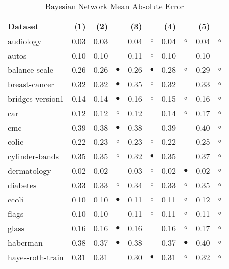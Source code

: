 \newpage
{\centering \footnotesize \begin{longtable}{lrr@{\hspace{0.1cm}}cr@{\hspace{0.1cm}}cr@{\hspace{0.1cm}}cr@{\hspace{0.1cm}}c}
\caption{\label{bnmae}Bayesian Network Mean Absolute Error}
\\
\hline
Dataset & (1)& (2) & & (3) & & (4) & & (5) & \\
\hline
audiology & 0.03 & 0.03 &            & 0.04 &   $\circ$ & 0.04 &   $\circ$ & 0.04 &   $\circ$\\
autos & 0.10 & 0.10 &            & 0.11 &   $\circ$ & 0.10 &           & 0.10 &          \\
balance-scale & 0.26 & 0.26 &  $\bullet$ & 0.26 & $\bullet$ & 0.28 &   $\circ$ & 0.29 &   $\circ$\\
breast-cancer & 0.32 & 0.32 &  $\bullet$ & 0.35 &   $\circ$ & 0.32 &           & 0.33 &   $\circ$\\
bridges-version1 & 0.14 & 0.14 &  $\bullet$ & 0.16 &   $\circ$ & 0.15 &   $\circ$ & 0.16 &   $\circ$\\
car & 0.12 & 0.12 &    $\circ$ & 0.12 &           & 0.14 &   $\circ$ & 0.17 &   $\circ$\\
cmc & 0.39 & 0.38 &  $\bullet$ & 0.38 &           & 0.39 &           & 0.40 &   $\circ$\\
colic & 0.22 & 0.23 &    $\circ$ & 0.23 &   $\circ$ & 0.22 &           & 0.25 &   $\circ$\\
cylinder-bands & 0.35 & 0.35 &    $\circ$ & 0.32 & $\bullet$ & 0.35 &           & 0.37 &   $\circ$\\
dermatology & 0.02 & 0.02 &            & 0.03 &   $\circ$ & 0.02 & $\bullet$ & 0.02 &   $\circ$\\
diabetes & 0.33 & 0.33 &    $\circ$ & 0.34 &   $\circ$ & 0.33 &   $\circ$ & 0.35 &   $\circ$\\
ecoli & 0.10 & 0.10 &  $\bullet$ & 0.11 &   $\circ$ & 0.11 &   $\circ$ & 0.12 &   $\circ$\\
flags & 0.10 & 0.10 &            & 0.11 &   $\circ$ & 0.11 &   $\circ$ & 0.11 &   $\circ$\\
glass & 0.16 & 0.16 &  $\bullet$ & 0.16 &           & 0.16 &   $\circ$ & 0.17 &   $\circ$\\
haberman & 0.38 & 0.37 &  $\bullet$ & 0.38 &           & 0.37 & $\bullet$ & 0.40 &   $\circ$\\
hayes-roth-train & 0.31 & 0.31 &            & 0.30 & $\bullet$ & 0.31 &   $\circ$ & 0.32 &   $\circ$\\

\end{longtable}}
